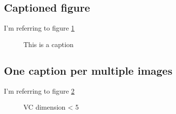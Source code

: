 \subsection{Captioned figure}
I'm referring to figure \ref{refer_sample}
\begin{figure}[!ht]
    \begin{minipage}[c]{\linewidth}
        \centering
        \captionsetup{justification=centering}
        \caption{This is a caption}
        \label{refer_sample}
    \end{minipage}
\end{figure}

\subsection{One caption per multiple images}
I'm referring to figure \ref{refer_sample_2}
\begin{figure}[!ht]
    \centering
    \qquad
    \captionsetup{justification=centering}
    \caption{VC dimension < 5}%
    \label{refer_sample_2}%
\end{figure}